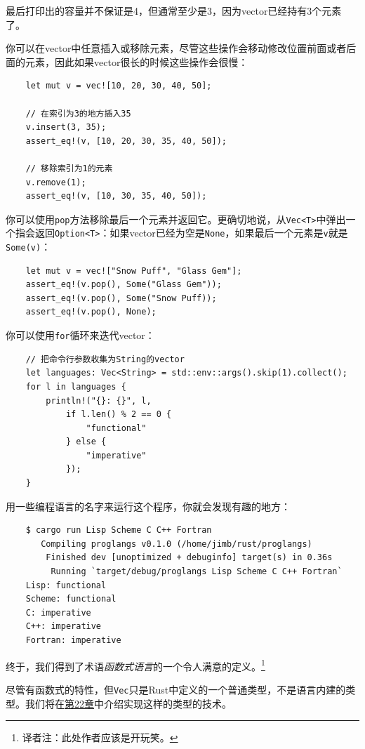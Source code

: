 最后打印出的容量并不保证是4，但通常至少是3，因为vector已经持有3个元素了。

你可以在vector中任意插入或移除元素，尽管这些操作会移动修改位置前面或者后面的元素，因此如果vector很长的时候这些操作会很慢：
\begin{verbatim}
    let mut v = vec![10, 20, 30, 40, 50];

    // 在索引为3的地方插入35
    v.insert(3, 35);
    assert_eq!(v, [10, 20, 30, 35, 40, 50]);

    // 移除索引为1的元素
    v.remove(1);
    assert_eq!(v, [10, 30, 35, 40, 50]);
\end{verbatim}

你可以使用\texttt{pop}方法移除最后一个元素并返回它。更确切地说，从\texttt{Vec<T>}中弹出一个指会返回\texttt{Option<T>}：如果vector已经为空是\texttt{None}，如果最后一个元素是\texttt{v}就是\texttt{Some(v)}：
\begin{verbatim}
    let mut v = vec!["Snow Puff", "Glass Gem"];
    assert_eq!(v.pop(), Some("Glass Gem"));
    assert_eq!(v.pop(), Some("Snow Puff));
    assert_eq!(v.pop(), None);
\end{verbatim}

你可以使用\texttt{for}循环来迭代vector：
\begin{verbatim}
    // 把命令行参数收集为String的vector
    let languages: Vec<String> = std::env::args().skip(1).collect();
    for l in languages {
        println!("{}: {}", l,
            if l.len() % 2 == 0 {
                "functional"
            } else {
                "imperative"
            });
    }
\end{verbatim}

用一些编程语言的名字来运行这个程序，你就会发现有趣的地方：
\begin{verbatim}
    $ cargo run Lisp Scheme C C++ Fortran
       Compiling proglangs v0.1.0 (/home/jimb/rust/proglangs)
        Finished dev [unoptimized + debuginfo] target(s) in 0.36s
         Running `target/debug/proglangs Lisp Scheme C C++ Fortran`
    Lisp: functional
    Scheme: functional
    C: imperative
    C++: imperative
    Fortran: imperative
\end{verbatim}

终于，我们得到了术语\emph{函数式语言}的一个令人满意的定义。\footnote{译者注：此处作者应该是开玩笑。}

尽管有函数式的特性，但\texttt{Vec}只是Rust中定义的一个普通类型，不是语言内建的类型。我们将在\hyperref[ch22]{第22章}中介绍实现这样的类型的技术。


